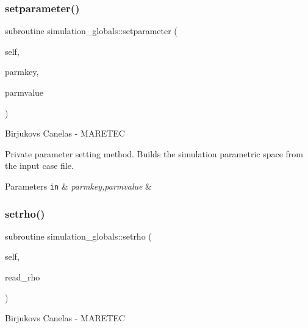 \subsubsection{\texorpdfstring{setparameter()}{setparameter()}}
{\footnotesize\ttfamily subroutine simulation\+\_\+globals\+::setparameter (\begin{DoxyParamCaption}\item[{class(\hyperlink{structsimulation__globals_1_1parameters__t}{parameters\+\_\+t}), intent(inout)}]{self,  }\item[{type(string), intent(in)}]{parmkey,  }\item[{type(string), intent(in)}]{parmvalue }\end{DoxyParamCaption})\hspace{0.3cm}{\ttfamily [private]}}



Birjukovs Canelas -\/ M\+A\+R\+E\+T\+EC 

Private parameter setting method. Builds the simulation parametric space from the input case file. 
\begin{DoxyParams}[1]{Parameters}
\mbox{\tt in}  & {\em parmkey,parmvalue} & \\
\hline
\end{DoxyParams}
\mbox{\label{namespacesimulation__globals_acfdc640757f0275bccb1d8de7bd7dc92}} 
\subsubsection{\texorpdfstring{setrho()}{setrho()}}
{\footnotesize\ttfamily subroutine simulation\+\_\+globals\+::setrho (\begin{DoxyParamCaption}\item[{class(\hyperlink{structsimulation__globals_1_1constants__t}{constants\+\_\+t}), intent(inout)}]{self,  }\item[{type(string), intent(in)}]{read\+\_\+rho }\end{DoxyParamCaption})\hspace{0.3cm}{\ttfamily [private]}}



Birjukovs Canelas -\/ M\+A\+R\+E\+T\+EC 

